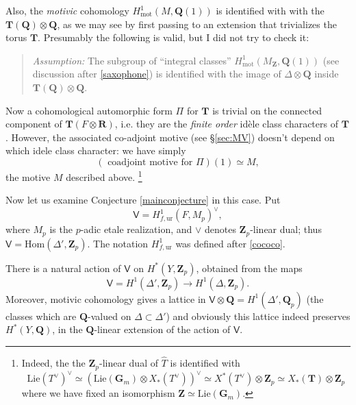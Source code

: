 \documentclass[10pt]{amsart}
\newcommand{\Z}{\mathbf{Z}}
\newcommand{\mot}{\mathrm{mot}}
\newcommand{\Hom}{\mathrm{Hom}}
\newcommand{\Lie}{\mathrm{Lie}}
\newcommand{\Q}{\mathbf{Q}}
\newcommand{\R}{\mathbf{R}}
\theoremstyle{remark}
\begin{document}
Also, the {\em motivic} cohomology $H^1_{\mot}(M, \Q(1))$
is identified with  with the $\mathbf{T}(\Q) \otimes \Q$,  as we may see by first passing to an extension that trivializes the torus $\mathbf{T}$. Presumably
the following is valid, but I did not try to check it:

\begin{quote} {\em Assumption:} The subgroup of ``integral classes'' $H^1_{\mot}(M_{\Z}, \Q(1))$ (see discussion after \eqref{saxophone}) is identified  with the image of $\Delta \otimes \Q$ inside $\mathbf{T}(\Q) \otimes \Q$. 
\end{quote}

Now a cohomological automorphic form $\Pi$ for $\mathbf{T}$ is trivial on the connected component of $\mathbf{T}(F \otimes \R)$, i.e.
they are the {\em finite order}  id{\`e}le class characters of $\mathbf{T}$.   
However, the associated co-adjoint motive (see \S \ref{sec:MV}) doesn't depend on which idele class character: we have simply 
$$ \left(\mbox{ coadjoint motive for $\Pi$}  \right) (1) \simeq M,$$
the motive $M$ described above. \footnote{
 Indeed, the the $\Z_{p}$-linear dual of $\hat{T}$ is identified with 
$$ \Lie(T^{\vee})^{\vee} \simeq \left( \Lie(\mathbf{G}_m) \otimes X_*(T^{\vee}) \right)^{\vee} \simeq X^*(T^{\vee})  \otimes \Z_p \simeq X_*(\mathbf{T}) \otimes \Z_{p}$$
where we have fixed an isomorphism $\Z \simeq \Lie(\mathbf{G}_m)$.  }


 
%
%
%
%
%
%
%
%
%
%
%
%
%
%
%
%
%

Now let us examine Conjecture \ref{mainconjecture} in this case. Put 
$$\mathsf{V} = H^1_{f, \mathrm{ur}}(F,  M_p)^{\vee},$$
where $M_p$ is the $p$-adic etale realization, and $\vee$ denotes $\Z_p$-linear dual; thus $\mathsf{V} = \Hom(\Delta',\Z_p)$. 
The notation $H^1_{f, \mathrm{ur}}$ was defined after \eqref{cococo}. 
 
 
There is a natural action of $\mathsf{V}$ on $H^*(Y, \Z_p)$,
obtained from the maps
\begin{equation} \label{frow} \mathsf{V} = H^1(\Delta', \Z_p) \rightarrow H^1(\Delta, \Z_p). \end{equation}
Moreover, motivic cohomology gives a lattice in $\mathsf{V} \otimes \Q = H^1(\Delta', \Q_p)$
(the classes which are $\Q$-valued on $\Delta \subset \Delta'$)
and obviously this lattice indeed preserves $H^*(Y, \Q)$, in the
$\Q$-linear extension of the action of $\mathsf{V}$. 
\end{document}
